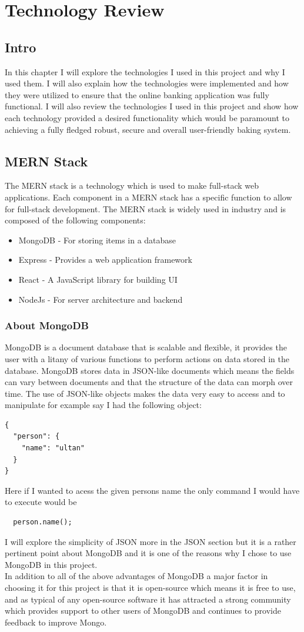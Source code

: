 \chapter{Technology Review}
\section{Intro}
In this chapter I will explore the technologies I used in this project and why I used them.  I will also explain how the technologies were implemented and how they were utilized to ensure that the online banking application was fully functional.  I will also review the technologies I used in this project and show how each technology provided a desired functionality which would be paramount to achieving a fully fledged robust, secure and overall user-friendly baking system.
\section{MERN Stack}
The MERN stack is a technology which is used to make full-stack web applications.  Each component in a MERN stack has a specific function to allow for full-stack development.  The MERN stack is widely used in industry and is composed of the following components:
 \begin{itemize}
  \item MongoDB - For storing items in a database
  \item Express - Provides a web application framework
  \item React - A JavaScript library for building UI
  \item NodeJs - For server architecture and backend
\end{itemize}
\subsection{About MongoDB}
MongoDB is a document database that is scalable and flexible, it provides the user with a litany of various functions to perform actions on data stored in the database.  MongoDB stores data in JSON-like documents which means the fields can vary between documents and that the structure of the data can morph over time.  The use of JSON-like objects makes the data very easy to access and to manipulate for example say I had the following object:
\begin{verbatim}
{
  "person": {
    "name": "ultan"
  }
}
\end{verbatim}
Here if I wanted to acess the given persons name the only command I would have to execute would be \begin{verbatim}
  person.name();
\end{verbatim}
I will explore the simplicity of JSON more in the JSON section but it is a rather pertinent point about MongoDB and it is one of the reasons why I chose to use MongoDB in this project.
\\
 In addition to all of the above advantages of MongoDB a major factor in choosing it for this project is that it is open-source which means it is free to use, and as typical of any open-source software it has attracted a strong community which provides support to other users of MongoDB and continues to provide feedback to improve Mongo.
